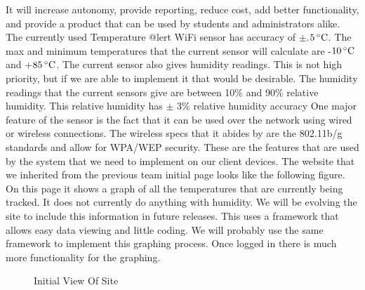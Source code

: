 \documentclass{report}
\begin{document}
It will increase autonomy, provide reporting, reduce cost, add better functionality, 
and provide a product that can be used by students and administrators alike.
\newline
\indent
	The currently used Temperature @lert WiFi sensor has accuracy of $\pm$.$5\,^{\circ}{\rm C}$. The max and minimum temperatures that the current sensor will calculate are -$10\,^{\circ}{\rm C}$ and +$85\,^{\circ}{\rm C}$. 
The current sensor also gives humidity readings. 
This is not high priority, but if we are able to implement it that would be desirable.
 The humidity readings that the current sensors give are between 10$\%$ and 90$\%$ relative humidity. 
This relative humidity has $\pm$ 3$\%$ relative humidity accuracy One major feature of the sensor is the fact that it can be used over the network using wired or wireless connections. 
The wireless specs that it abides by are the 802.11b/g standards and allow for WPA/WEP security. 
These are the features that are used by the system that we need to implement on our client devices.
\newline
\indent
The website that we inherited from the previous team initial page looks like the following figure. 
On this page it shows a graph of all the temperatures that are currently being tracked. 
It does not currently do anything with humidity.  We will be evolving the site to include this information in future releases. 
This uses a framework that allows easy data viewing and little coding. 
We will probably use the same framework to implement this graphing process. 
Once logged in there is much more functionality for the graphing. 
\begin{figure}[H]
\caption{Initial View Of Site}
\end{figure}
\end{document}
